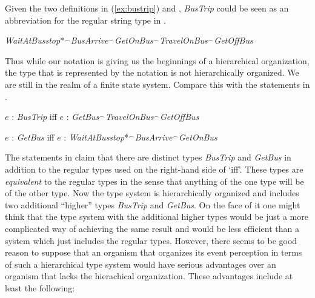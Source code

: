 Given the two definitions in
(\ref{ex:bustrip}) and \preveg{}, \textit{BusTrip} could be seen as an
abbreviation for the regular string type in \nexteg{}.
\begin{ex} 
\textit{WaitAtBusstop}*$^{\frown}$\textit{BusArrive}$^{\frown}$\textit{GetOnBus}$^{\frown}$\textit{TravelOnBus}$^{\frown}$\textit{GetOffBus} 
\end{ex} 
Thus while our notation is giving us the beginnings of a hierarchical
organization, the type that is represented by the notation is not
hierarchically organized.  We are still in the realm of a finite state
system.
Compare this with the statements in \nexteg{}.
\begin{ex} 
\begin{subex} 
 
\item $e$ : \textit{BusTrip} iff $e$ : \textit{GetBus}$^{\frown}$\textit{TravelOnBus}$^{\frown}$\textit{GetOffBus} 
 
\item $e$ : \textit{GetBus} iff $e$ : \textit{WaitAtBusstop}*$^{\frown}$\textit{BusArrive}$^{\frown}$\textit{GetOnBus} 
 
\end{subex} 
   
\end{ex} 
The statements in \preveg{} claim that there are distinct types
\textit{BusTrip} and \textit{GetBus} in addition to the regular types
used on the right-hand side of `iff'.  These types are
\textit{equivalent} to the regular types in the sense that anything of
the one type will be of the other type.  Now the type system
is
hierarchically organized and includes two additional ``higher''
types \textit{BusTrip} and \textit{GetBus}.  On the face of it one
might think that the type system with the additional higher types
would be just a more complicated way of achieving the same result and
would be less efficient than a system which just includes the regular
types.  However, there seems to be good reason to suppose that an
organism that organizes its event perception in terms of such a
hierarchical type system would have serious advantages over an
organism that lacks the hierachical organization.  These advantages
include at least the following:
